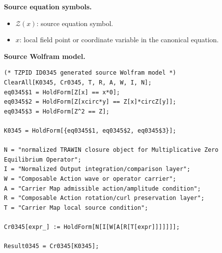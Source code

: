 \begin{minipage}[t]{0.49\linewidth}
\begingroup
\small
\raggedright
\textbf{Source equation symbols.}\par
\begin{itemize}[leftmargin=1.35em,itemsep=1pt,topsep=1pt,parsep=0pt]
    \item $\mathcal{Z}(x)$: source equation symbol.
    \item $x$: local field point or coordinate variable in the canonical equation.
\end{itemize}
\endgroup
\end{minipage}\hfill
\begin{minipage}[t]{0.47\linewidth}
\begingroup
\scriptsize
\raggedright
\textbf{Source Wolfram model.}\par
\begin{Verbatim}[fontsize=\tiny,breaklines=true,breakanywhere=true]
(* TZPID ID0345 generated source Wolfram model *)
ClearAll[K0345, Cr0345, T, R, A, W, I, N];
eq0345$1 = HoldForm[Z[x] == x*0];
eq0345$2 = HoldForm[Z[xcirc*y] == Z[x]*circZ[y]];
eq0345$3 = HoldForm[Z^2 == Z];

K0345 = HoldForm[{eq0345$1, eq0345$2, eq0345$3}];

N = "normalized TRAWIN closure object for Multiplicative Zero Equilibrium Operator";
I = "Normalized Output integration/comparison layer";
W = "Composable Action wave or operator carrier";
A = "Carrier Map admissible action/amplitude condition";
R = "Composable Action rotation/curl preservation layer";
T = "Carrier Map local source condition";

Cr0345[expr_] := HoldForm[N[I[W[A[R[T[expr]]]]]]];

Result0345 = Cr0345[K0345];
\end{Verbatim}
\endgroup
\end{minipage}

